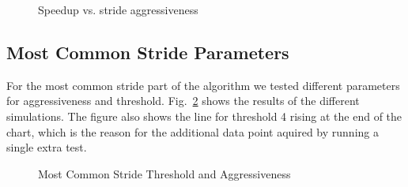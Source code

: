 \begin{figure}
	
	\caption{Speedup vs. stride aggressiveness}
	\label{fig:aggr}
\end{figure}

\subsection{Most Common Stride Parameters}

For the most common stride part of the algorithm we tested different parameters
for aggressiveness and threshold. Fig.~\ref{fig:mcs_tweaks} shows the results
of the different simulations.
The figure also shows the line for threshold 4 rising at the end of the chart,
which is the reason for the additional data point aquired by running a single
extra test.

\begin{figure}
	
	\caption{Most Common Stride Threshold and Aggressiveness}
	\label{fig:mcs_tweaks}
\end{figure}
